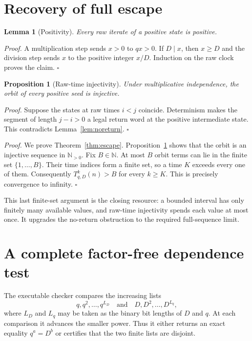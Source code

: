 \documentclass[11pt,letterpaper]{article}
\newtheorem{lemma}[theorem]{Lemma}
\newtheorem{proposition}[theorem]{Proposition}
\newenvironment{proof}{\noindent\textit{Proof.}}{\hfill\(\square\)}
\newcommand{\N}{\mathbb{N}}
\begin{document}
\section{Recovery of full escape}

\begin{lemma}[Positivity]
Every raw iterate of a positive state is positive.
\end{lemma}

\begin{proof}
A multiplication step sends $x>0$ to $qx>0$.  If $D\mid x$, then
$x\geq D$ and the division step sends $x$ to the positive integer $x/D$.
Induction on the raw clock proves the claim.
\end{proof}

\begin{proposition}[Raw-time injectivity]\label{prop:injective}
Under multiplicative independence, the orbit of every positive seed is
injective.
\end{proposition}

\begin{proof}
Suppose the states at raw times $i<j$ coincide.  Determinism makes the
segment of length $j-i>0$ a legal return word at the positive intermediate
state.  This contradicts Lemma~\ref{lem:noreturn}.
\end{proof}

\begin{proof}
We prove Theorem~\ref{thm:escape}.
Proposition~\ref{prop:injective} shows that the orbit is an injective
sequence in $\N_{>0}$.  Fix $B\in\N$.  At most $B$ orbit terms can lie in
the finite set $\{1,\ldots,B\}$.  Their time indices form a finite set, so
a time $K$ exceeds every one of them.  Consequently
$T_{q,D}^{k}(n)>B$ for every $k\geq K$.  This is precisely convergence to
infinity.
\end{proof}

This last finite-set argument is the closing resource: a bounded interval
has only finitely many available values, and raw-time injectivity spends each
value at most once.  It upgrades the no-return obstruction to the required
full-sequence limit.

\section{A complete factor-free dependence test}

The executable checker compares the increasing lists
\[
 q,q^2,\ldots,q^{L_D}
 \quad\text{and}\quad
 D,D^2,\ldots,D^{L_q},
\]
where $L_D$ and $L_q$ may be taken as the binary bit lengths of $D$ and $q$.
At each comparison it advances the smaller power.  Thus it either returns
an exact equality $q^a=D^b$ or certifies that the two finite lists are
disjoint.
\end{document}
